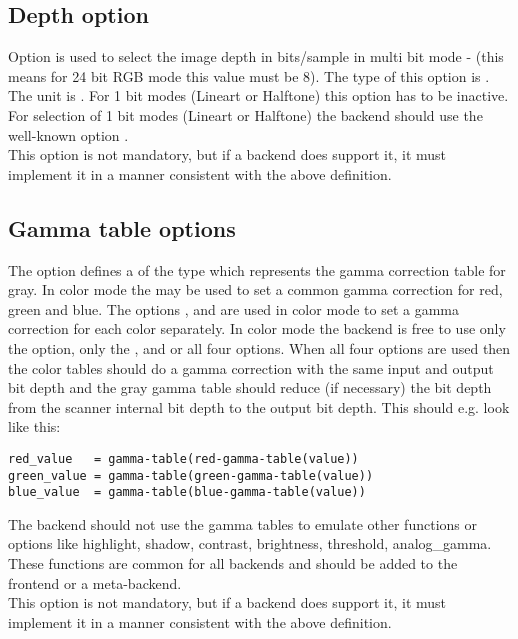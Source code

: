 \documentclass[11pt,DVIps]{report}
\begin{document}
\subsection{Depth option}
\begin{changebar}
Option  is used to select the image depth in bits/sample
in multi bit mode - (this means for 24 bit RGB mode this value must be 8).
The type of this option is .
The unit is . For 1 bit modes
(Lineart or Halftone) this option has to be inactive.
For selection of 1 bit modes (Lineart or Halftone) the
backend should use the well-known option .\\
 
This option is not mandatory, but if a backend does support it, it
must implement it in a manner consistent with the above definition.\\
\end{changebar}
 
\subsection{Gamma table options}
\begin{changebar}
The  option defines a 
of the type  which represents the gamma correction
table for gray.  In color mode the  may be used to set
a common gamma correction for red, green and blue. The options
,  and 
are used in color mode to set a gamma correction for each color
separately. In color mode the backend is free to use only the
 option, only the ,  and
 or all four options. When all four options
are used then the color tables should do a gamma correction with
the same input and output bit depth and the gray gamma table should
reduce (if necessary) the bit depth from the scanner internal
bit depth to the output bit depth. This should e.g. look like this:
\begin{verbatim}
red_value   = gamma-table(red-gamma-table(value))
green_value = gamma-table(green-gamma-table(value))
blue_value  = gamma-table(blue-gamma-table(value))
\end{verbatim}

The backend should not use the gamma tables to emulate other functions or options
like highlight, shadow, contrast, brightness, threshold, analog\_gamma.
These functions are common for all backends and should be added to the frontend
or a meta-backend.\\
 
This option is not mandatory, but if a backend does support it, it
must implement it in a manner consistent with the above definition.\\
\end{changebar}
 
\end{document}
